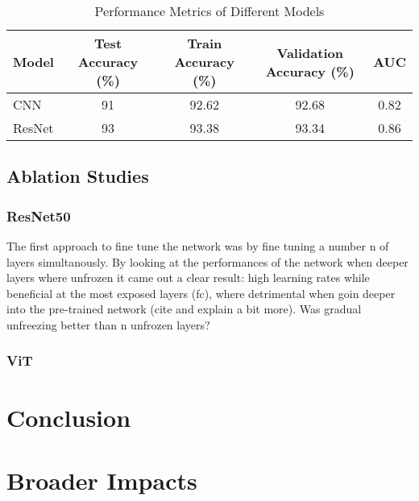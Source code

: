 \documentclass{article}
\begin{document}
\renewcommand{\arraystretch}{1.2} 
\begin{table}[h!] %
    \centering %
    \caption{Performance Metrics of Different Models} %
    \label{tab:fully_binary_perf} %
    \begin{tabular}{|l|c|c|c|c|}
        \hline
        Model & Test Accuracy (\%) & Train Accuracy (\%) & Validation Accuracy (\%) & AUC \\
        \hline
        CNN & 91 & 92.62 & 92.68 & 0.82 \\
        ResNet & 93 & 93.38 & 93.34 & 0.86 \\
        \hline
    \end{tabular}
\end{table}

\subsection{Ablation Studies}


\subsubsection{ResNet50}
The first approach to fine tune the network was by fine tuning a number n of layers simultanously. By looking at the performances of the network when deeper layers where unfrozen it came out a clear result: high learning rates while beneficial at the most exposed layers (fc), where detrimental when goin deeper into the pre-trained network (cite and explain a bit more). Was gradual unfreezing better than n unfrozen layers?

\subsubsection{ViT}

\section{Conclusion}


\section{Broader Impacts}
\end{document}
